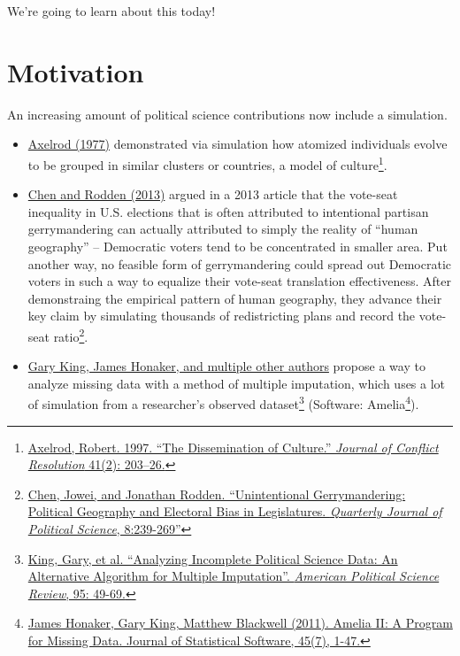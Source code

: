 \documentclass[]{book}
\providecommand{\tightlist}{%
  \setlength{\itemsep}{0pt}\setlength{\parskip}{0pt}}
\let\rmarkdownfootnote\footnote%
\def\footnote{\protect\rmarkdownfootnote}
\theoremstyle{definition}
\theoremstyle{definition}
\theoremstyle{definition}
\theoremstyle{remark}
\begin{document}
We're going to learn about this today!

\section{Motivation}\label{motivation-3}

An increasing amount of political science contributions now include a
simulation.

\begin{itemize}
\tightlist
\item
  \href{http://www-personal.umich.edu/~axe/research/Dissemination.pdf}{Axelrod
  (1977)} demonstrated via simulation how atomized individuals evolve to
  be grouped in similar clusters or countries, a model of
  culture\footnote{\href{http://www-personal.umich.edu/~axe/research/Dissemination.pdf}{Axelrod,
    Robert. 1997. ``The Dissemination of Culture.'' \emph{Journal of
    Conflict Resolution} 41(2): 203--26.}}.
\item
  \href{http://www-personal.umich.edu/~jowei/florida.pdf}{Chen and
  Rodden (2013)} argued in a 2013 article that the vote-seat inequality
  in U.S. elections that is often attributed to intentional partisan
  gerrymandering can actually attributed to simply the reality of
  ``human geography'' -- Democratic voters tend to be concentrated in
  smaller area. Put another way, no feasible form of gerrymandering
  could spread out Democratic voters in such a way to equalize their
  vote-seat translation effectiveness. After demonstraing the empirical
  pattern of human geography, they advance their key claim by simulating
  thousands of redistricting plans and record the vote-seat
  ratio\footnote{\href{http://www-personal.umich.edu/~jowei/florida.pdf}{Chen,
    Jowei, and Jonathan Rodden. ``Unintentional Gerrymandering:
    Political Geography and Electoral Bias in Legislatures.
    \emph{Quarterly Journal of Political Science}, 8:239-269''}}.
\item
  \href{https://gking.harvard.edu/files/abs/evil-abs.shtml}{Gary King,
  James Honaker, and multiple other authors} propose a way to analyze
  missing data with a method of multiple imputation, which uses a lot of
  simulation from a researcher's observed dataset\footnote{\href{https://gking.harvard.edu/files/abs/evil-abs.shtml}{King,
    Gary, et al. ``Analyzing Incomplete Political Science Data: An
    Alternative Algorithm for Multiple Imputation''. \emph{American
    Political Science Review}, 95: 49-69.}} (Software: Amelia\footnote{\href{http://www.jstatsoft.org/v45/i07/}{James
    Honaker, Gary King, Matthew Blackwell (2011). Amelia II: A Program
    for Missing Data. Journal of Statistical Software, 45(7), 1-47.}}).
\end{itemize}
\end{document}
